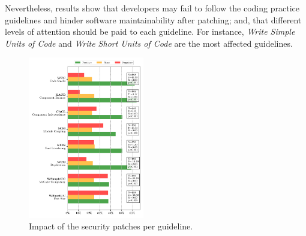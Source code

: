 \documentclass[10pt,conference]{IEEEtran}
\begin{document}
Nevertheless, results show that developers may fail to follow the coding
practice guidelines and hinder software maintainability after patching; and, 
that different levels of attention should be paid to each guideline. For instance,
\emph{Write Simple Units of Code} and \emph{Write Short Units of Code}
are the most affected guidelines.

 
%
% 
 \begin{figure}[h]
  	\centering
 	\vspace{-0.3 cm}
  	\includegraphics[width=0.45\textwidth]{figures/main_per_guideline.pdf}
 	\vspace{-0.3 cm}
  	\caption{Impact of the security patches per guideline.}
 	\label{fig:guidelines}
 	\vspace{0.2 cm}
 \end{figure}
 
\end{document}
